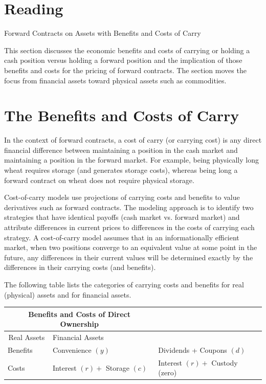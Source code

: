 \documentclass[11pt]{article}
\begin{document}
\section*{Reading}
Forward Contracts on Assets with Benefits and Costs of Carry

This section discusses the economic benefits and costs of carrying or holding a cash position versus holding a forward position and the implication of those benefits and costs for the pricing of forward contracts. The section moves the focus from financial assets toward physical assets such as commodities.

\section*{The Benefits and Costs of Carry}
In the context of forward contracts, a cost of carry (or carrying cost) is any direct financial difference between maintaining a position in the cash market and maintaining a position in the forward market. For example, being physically long wheat requires storage (and generates storage costs), whereas being long a forward contract on wheat does not require physical storage.

Cost-of-carry models use projections of carrying costs and benefits to value derivatives such as forward contracts. The modeling approach is to identify two strategies that have identical payoffs (cash market vs. forward market) and attribute differences in current prices to differences in the costs of carrying each strategy. A cost-of-carry model assumes that in an informationally efficient market, when two positions converge to an equivalent value at some point in the future, any differences in their current values will be determined exactly by the differences in their carrying costs (and benefits).

The following table lists the categories of carrying costs and benefits for real (physical) assets and for financial assets.

\begin{center}
\begin{tabular}{|lll|}
\hline
\multicolumn{2}{c|}{Benefits and Costs of Direct Ownership} &  \\
\hline
\multicolumn{1}{|c|}{Real Assets} & Financial Assets &  \\
\hline
Benefits & Convenience $(y)$ & Dividends + Coupons $(d)$ \\
Costs & Interest $(r)+$ Storage $(c)$ & Interest $(r)+$ Custody (zero) \\
\hline
\end{tabular}
\end{center}
\end{document}
